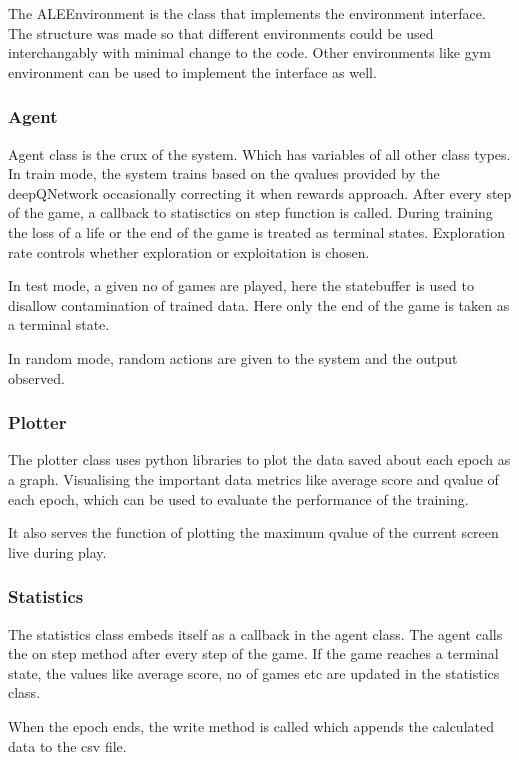 \documentclass[a4paper,11pt]{article}
\begin{document}
				The ALEEnvironment is the class that implements the environment interface. The structure was made so that different environments could be used interchangably with minimal change to the code. Other environments like gym environment can be used to implement the interface as well.

			\subsubsection{Agent}
				Agent class is the crux of the system. Which has variables of all other class types. In train mode, the system trains based on the qvalues provided by the deepQNetwork occasionally correcting it when rewards approach. After every step of the game, a callback to statisctics on step function is called. During training the loss of a life or the end of the game is treated as terminal states. Exploration rate controls whether exploration or exploitation is chosen. 

				In test mode, a given no of games are played, here the statebuffer is used to disallow contamination of trained data. Here only the end of the game is taken as a terminal state.

				In random mode, random actions are given to the system and the output observed.

			\subsubsection{Plotter}
				The plotter class uses python libraries to plot the data saved about each epoch as a graph. Visualising the important data metrics like average score and qvalue of each epoch, which can be used to evaluate the performance of the training.

				It also serves the function of plotting the maximum qvalue of the current screen live during play.
			
			\subsubsection{Statistics}
				The statistics class embeds itself as a callback in the agent class. The agent calls the on step method after every step of the game. If the game reaches a terminal state, the values like average score, no of games etc are updated in the statistics class.

				When the epoch ends, the write method is called which appends the calculated data to the csv file.
\end{document}

